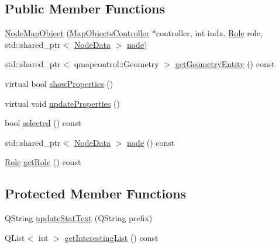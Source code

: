 \subsection*{Public Member Functions}
\begin{DoxyCompactItemize}
\item 
\mbox{\hyperlink{class_node_map_object_a413e339f70708ea67366483736a2ca0f}{Node\+Map\+Object}} (\mbox{\hyperlink{class_map_objects_controller}{Map\+Objects\+Controller}} $\ast$controller, int indx, \mbox{\hyperlink{class_node_map_object_a654b2381e7c128e1c9406dd892104a69}{Role}} role, std\+::shared\+\_\+ptr$<$ \mbox{\hyperlink{class_node_data}{Node\+Data}} $>$ \mbox{\hyperlink{class_node_map_object_ab13349428a88447dab159b77d1fc20b7}{node}})
\item 
std\+::shared\+\_\+ptr$<$ qmapcontrol\+::\+Geometry $>$ \mbox{\hyperlink{class_node_map_object_af6707ce2743bea4f8921d0cb124f29c9}{get\+Geometry\+Entity}} () const
\item 
virtual bool \mbox{\hyperlink{class_node_map_object_a58403912a2303138ee20e727c1c4a1b7}{show\+Properties}} ()
\item 
virtual void \mbox{\hyperlink{class_node_map_object_aed89e0f53469ec8af0675463ac11a9e7}{update\+Properties}} ()
\item 
bool \mbox{\hyperlink{class_node_map_object_a550f0cab2df541115b36c9d483490251}{selected}} () const
\item 
std\+::shared\+\_\+ptr$<$ \mbox{\hyperlink{class_node_data}{Node\+Data}} $>$ \mbox{\hyperlink{class_node_map_object_ab13349428a88447dab159b77d1fc20b7}{node}} () const
\item 
\mbox{\hyperlink{class_node_map_object_a654b2381e7c128e1c9406dd892104a69}{Role}} \mbox{\hyperlink{class_node_map_object_a5f98b6adabc1b8b2855ea1f7a6185df5}{get\+Role}} () const
\end{DoxyCompactItemize}
\subsection*{Protected Member Functions}
\begin{DoxyCompactItemize}
\item 
Q\+String \mbox{\hyperlink{class_node_map_object_ae0c4325f47620d7efa35f02d1b49a6df}{update\+Stat\+Text}} (Q\+String prefix)
\item 
Q\+List$<$ int $>$ \mbox{\hyperlink{class_node_map_object_a47e5c0ac77d93fd4ff73c6c281414ef7}{get\+Interesting\+List}} () const
\end{DoxyCompactItemize}


